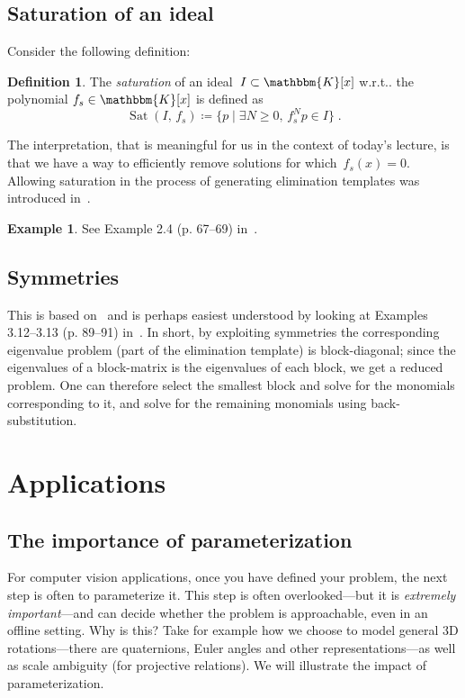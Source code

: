 \documentclass[11pt,a4paper]{article}
\makeatletter
\theoremstyle{definition}
\newtheorem{example}{Example}
\newtheorem{definition}{Definition}
\newcommand{\K}{\ensuremath{\mathbbm{K}}}
\DeclareMathOperator{\sat}{Sat}
\DeclareRobustCommand\wrt{w.r.t\@ifnextchar.{}{.\@}}
\makeatother
\begin{document}
\subsection{Saturation of an ideal}
Consider the following definition:
\begin{definition}
The \emph{saturation} of an ideal~$I\subset\K[x]$ \wrt{} the polynomial $f_s\in\K[x]$ is
defined as
\begin{equation}
    \sat(I,\, f_s) \coloneqq \{p\;|\;\exists N\geq 0,\, f_s^N p\in I  \}\;.
\end{equation}
\end{definition}
The interpretation, that is meaningful for us in the context of today's lecture, is that we
have a way to efficiently remove solutions for which~$f_s(x) =0$.
Allowing saturation in the process of generating elimination templates was introduced
in~\cite{larsson2017iccv}.

\begin{example}
See Example 2.4 (p. 67--69) in~\cite{larsson-phd}.
\end{example}

\subsection{Symmetries}
This is based on~\cite{larsson2016eccv} and is perhaps easiest understood by looking
at Examples 3.12--3.13 (p. 89--91) in~\cite{larsson-phd}.
In short, by exploiting symmetries the corresponding eigenvalue problem (part of the
elimination template) is block-diagonal; since the eigenvalues of a block-matrix is
the eigenvalues of each block, we get a reduced problem. One can therefore select the smallest
block and solve for the monomials corresponding to it, and solve for the remaining monomials
using back-substitution.

\section{Applications}
\subsection{The importance of parameterization}
For computer vision applications, once you have defined your problem, the next step is often to
parameterize it. This step is often overlooked---but it is \emph{extremely important}---and can
decide whether the problem is approachable, even in an offline setting. Why is this? Take
for example how we choose to model general 3D rotations---there are quaternions, Euler angles
and other representations---as well as scale ambiguity (for projective relations).
We will illustrate the impact of
parameterization.
\end{document}
